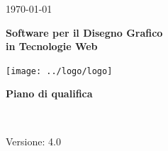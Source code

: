 \usepackage{multirow}
 
\title{\TITOLODOC}
\author{Carollo Mirko}
 

 
\renewcommand{\insertversion}{4.0} %
\renewcommand{\TITOLODOC}{Piano di qualifica} %
\renewcommand{\glosspath}{.\glossario} %
 
\begin{titlepage}
\begin{center}
  \begin{Large}  \today \end{Large}
\end{center}
 
\vspace{20pt}
 
\begin{center}
  \begin{Huge}
        \textbf{\ajax}
  \end{Huge}
\end{center}      
 
\begin{center}
  \begin{large}
        \textbf{Software per il Disegno Grafico\\ in Tecnologie Web}
  \end{large}
\end{center}      
 
\vspace{20pt}
 
\begin{center}
\texttt{[image: ../logo/logo]}
\end{center}
 
\vspace{170pt}
\begin{center} %
  \begin{Huge}
        \textbf{\TITOLODOC}
  \end{Huge}
      \\
\end{center}
\vspace{190pt}
\begin{center}
Versione: \insertversion
\end{center}
\end{titlepage}
 
